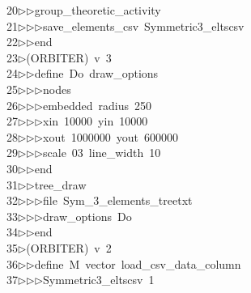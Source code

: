 \begin{tabbing}
20\>$\triangleright$\>$\triangleright$\>group\_theoretic\_activity\ \\[0pt]
21\>$\triangleright$\>$\triangleright$\>$\triangleright$\>save\_elements\_csv\ Symmetric3\_eltscsv\ \\[0pt]
22\>$\triangleright$\>$\triangleright$\>end\\[0pt]
23\>$\triangleright$\>(ORBITER)\ v\ 3\ \\[0pt]
24\>$\triangleright$\>$\triangleright$\>define\ Do\ draw\_options\ \\[0pt]
25\>$\triangleright$\>$\triangleright$\>$\triangleright$\>nodes\ \\[0pt]
26\>$\triangleright$\>$\triangleright$\>$\triangleright$\>embedded\ radius\ 250\ \\[0pt]
27\>$\triangleright$\>$\triangleright$\>$\triangleright$\>xin\ 10000\ yin\ 10000\ \\[0pt]
28\>$\triangleright$\>$\triangleright$\>$\triangleright$\>xout\ 1000000\ yout\ 600000\ \\[0pt]
29\>$\triangleright$\>$\triangleright$\>$\triangleright$\>scale\ 03\ line\_width\ 10\ \\[0pt]
30\>$\triangleright$\>$\triangleright$\>end\ \\[0pt]
31\>$\triangleright$\>$\triangleright$\>tree\_draw\ \\[0pt]
32\>$\triangleright$\>$\triangleright$\>$\triangleright$\>file\ Sym\_3\_elements\_treetxt\ \\[0pt]
33\>$\triangleright$\>$\triangleright$\>$\triangleright$\>draw\_options\ Do\ \\[0pt]
34\>$\triangleright$\>$\triangleright$\>end\\[0pt]
35\>$\triangleright$\>(ORBITER)\ v\ 2\ \\[0pt]
36\>$\triangleright$\>$\triangleright$\>define\ M\ vector\ load\_csv\_data\_column\ \\[0pt]
37\>$\triangleright$\>$\triangleright$\>$\triangleright$\>Symmetric3\_eltscsv\ 1\ \\[0pt]

\end{tabbing}
